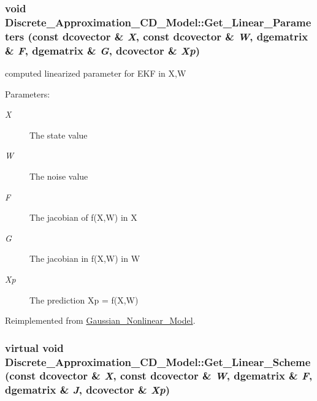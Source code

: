 \hypertarget{class_discrete___approximation___c_d___model_445e1215275e1f77f6260a186e9f842a}{
\subsubsection[{Get\_\-Linear\_\-Parameters}]{\setlength{\rightskip}{0pt plus 5cm}void Discrete\_\-Approximation\_\-CD\_\-Model::Get\_\-Linear\_\-Parameters (const dcovector \& {\em X}, \/  const dcovector \& {\em W}, \/  dgematrix \& {\em F}, \/  dgematrix \& {\em G}, \/  dcovector \& {\em Xp})}}
\label{class_discrete___approximation___c_d___model_445e1215275e1f77f6260a186e9f842a}


computed linearized parameter for EKF in X,W 

\begin{Desc}
\item[Parameters:]
\begin{description}
\item[{\em X}]The state value \item[{\em W}]The noise value \item[{\em F}]The jacobian of f(X,W) in X \item[{\em G}]The jacobian in f(X,W) in W \item[{\em Xp}]The prediction Xp = f(X,W) \end{description}
\end{Desc}


Reimplemented from \hyperlink{class_gaussian___nonlinear___model_c850a678b4672e4358d3f29d7b998549}{Gaussian\_\-Nonlinear\_\-Model}.\hypertarget{class_discrete___approximation___c_d___model_0a486fada10e6f5569d186edc7b32110}{
\subsubsection[{Get\_\-Linear\_\-Scheme}]{\setlength{\rightskip}{0pt plus 5cm}virtual void Discrete\_\-Approximation\_\-CD\_\-Model::Get\_\-Linear\_\-Scheme (const dcovector \& {\em X}, \/  const dcovector \& {\em W}, \/  dgematrix \& {\em F}, \/  dgematrix \& {\em J}, \/  dcovector \& {\em Xp})}}
\label{class_discrete___approximation___c_d___model_0a486fada10e6f5569d186edc7b32110}


